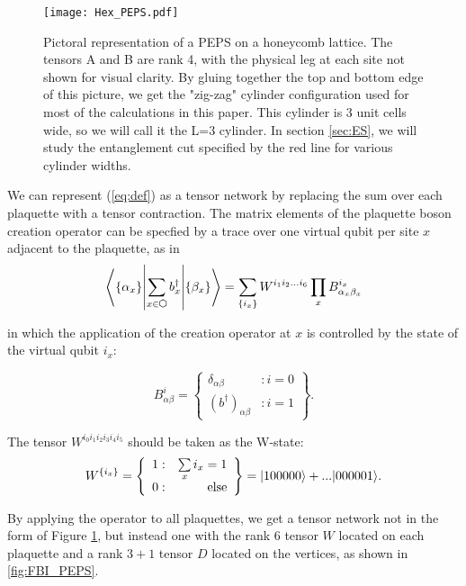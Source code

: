 \begin{figure}[H]
	\centering
	\texttt{[image: Hex\_PEPS.pdf]}
	\caption{Pictoral representation of a PEPS on a honeycomb lattice. The tensors A and B are rank 4, with the physical leg at each site not shown for visual clarity. By gluing together the top and bottom edge of this picture, we get the "zig-zag" cylinder configuration used for most of the calculations in this paper. This cylinder is 3 unit cells wide, so we will call it the L=3 cylinder. In section \ref{sec:ES}, we will study the entanglement cut specified by the red line for various cylinder widths.}
	\label{fig:PEPS}
\end{figure}

We can represent (\ref{eq:def}) as a tensor network by replacing the sum over each plaquette with a tensor contraction. The matrix elements of the plaquette boson creation operator can be specfied by a trace over one virtual qubit per site $x$ adjacent to the plaquette, as in 
\begin{equation}
\braopket{\{\alpha_x\}}{\sum\limits_{x \in \varhexagon} b^{\dagger}_{x}}{\{\beta_x\}} =
 \sum\limits_{\{i_x\}} W^{i_1 i_2 ... i_6} \prod\limits_x B^{i_x}_{\alpha_x \beta_x} 
\label{eq:plaquette}
\end{equation}

in which the application of the creation operator at $x$ is controlled by the state of the virtual qubit $i_x$:

$$
B^i_{\alpha \beta} = \left\{
     \begin{array}{lr}
       \delta_{\alpha \beta} & : i = 0\\
       (b^{\dagger})_{\alpha \beta} & : i = 1
     \end{array}
   \right\}.
$$

The tensor $W^{i_0 i_1 i_2 i_3 i_4 i_5}$ should be taken as the W-state: 
$$ W^{\{i_x\}}  = \left\{ \begin{array}{lr}
													1  : & \sum\limits_x i_x = 1 \\
													0  : & \text{else}
													\end{array}
											\right\} = \vert 100000 \rangle + ...\vert 000001 \rangle.
$$

By applying the operator to all plaquettes, we get a tensor network not in the form of Figure \ref{fig:PEPS}, but instead one with the rank 6 tensor $W$ located on each plaquette and a rank $3+1$ tensor $D$ located on the vertices, as shown in \ref{fig:FBI_PEPS}. 

